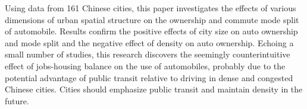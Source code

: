 Using data from 161 Chinese cities, this paper investigates the effects of various dimensions of urban spatial structure on the ownership and commute mode split of automobile. Results confirm the positive effects of city size on auto ownership and mode split and the negative effect of density on auto ownership. Echoing a small number of studies, this research discovers the seemingly counterintuitive effect of jobs-housing balance on the use of automobiles, probably due to the potential advantage of public transit relative to driving in dense and congested Chinese cities. Cities should emphasize public transit and maintain density in the future.
